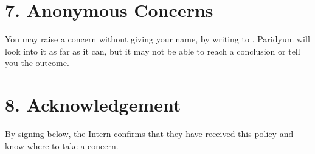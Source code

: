 \documentclass{paridyum}
\begin{document}
\section*{7. Anonymous Concerns}
You may raise a concern without giving your name, by writing to
\dkOrgEmail. Paridyum will look into it as far as it can, but it may not be
able to reach a conclusion or tell you the outcome.

\section*{8. Acknowledgement}
By signing below, the Intern confirms that they have received this policy and
know where to take a concern.

\vspace{1.2em}
\paridyumofficers{\dkSigCeoName}{\dkSigCeoDesignation}{\dkSigCtoName}{\dkSigCtoDesignation}

\vspace{1.2em}
\end{document}
